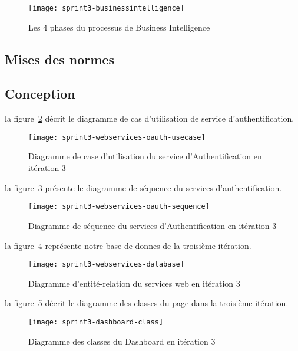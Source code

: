 \begin{figure}[htbp]
  \centering
  \texttt{[image: sprint3-businessintelligence]}
  \caption{Les 4 phases du processus de Business Intelligence}
  \label{fig:sprint3-businessintelligence}
\end{figure}

\subsection{Mises des normes}

\subsection{Conception}
la figure~\ref{fig:sprint3-webservices-oauth-usecase} décrit le diagramme
de cas d'utilisation de service d'authentification.
\begin{figure}[htbp]
    \centering
    \texttt{[image: sprint3-webservices-oauth-usecase]}
    \caption{Diagramme de case d'utilisation du service d'Authentification en itération 3}
      \label{fig:sprint3-webservices-oauth-usecase}
\end{figure}
la figure~\ref{fig:sprint3-webservices-oauth-sequence} présente le diagramme de séquence
du services d'authentification.
\begin{figure}[htbp]
    \centering
    \texttt{[image: sprint3-webservices-oauth-sequence]}
    \caption{Diagramme de séquence du services d'Authentification en itération 3}
    \label{fig:sprint3-webservices-oauth-sequence}
\end{figure}
la figure~\ref{fig:sprint3-webservices-database} représente notre base de donnes
de la troisième itération.
\begin{figure}[htbp]
    \centering
    \texttt{[image: sprint3-webservices-database]}
    \caption{Diagramme d'entité-relation du services web en itération 3}
    \label{fig:sprint3-webservices-database}
\end{figure}

la figure~\ref{fig:sprint3-dashboard-classs} décrit le diagramme des classes
du page  dans la troisième itération.
\begin{figure}[htbp]
    \centering
    \texttt{[image: sprint3-dashboard-class]}
    \caption{Diagramme des classes du Dashboard en itération 3}
    \label{fig:sprint3-dashboard-classs}
\end{figure}
\\

